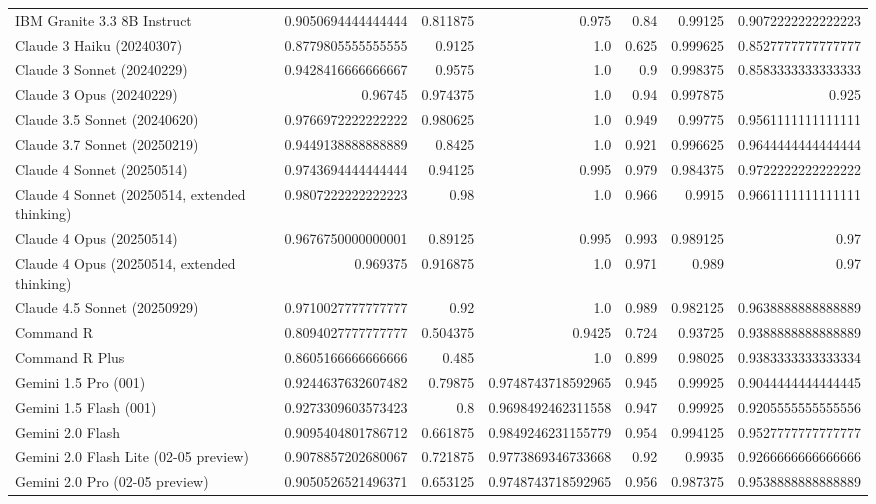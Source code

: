 \begin{table}[htp]
{\begin{tabular}{lrrrrrr}
IBM Granite 3.3 8B Instruct & 0.9050694444444444 & 0.811875 & 0.975 & 0.84 & 0.99125 & 0.9072222222222223 \\
Claude 3 Haiku (20240307) & 0.8779805555555555 & 0.9125 & 1.0 & 0.625 & 0.999625 & 0.8527777777777777 \\
Claude 3 Sonnet (20240229) & 0.9428416666666667 & 0.9575 & 1.0 & 0.9 & 0.998375 & 0.8583333333333333 \\
Claude 3 Opus (20240229) & 0.96745 & 0.974375 & 1.0 & 0.94 & 0.997875 & 0.925 \\
Claude 3.5 Sonnet (20240620) & 0.9766972222222222 & 0.980625 & 1.0 & 0.949 & 0.99775 & 0.9561111111111111 \\
Claude 3.7 Sonnet (20250219) & 0.9449138888888889 & 0.8425 & 1.0 & 0.921 & 0.996625 & 0.9644444444444444 \\
Claude 4 Sonnet (20250514) & 0.9743694444444444 & 0.94125 & 0.995 & 0.979 & 0.984375 & 0.9722222222222222 \\
Claude 4 Sonnet (20250514, extended thinking) & 0.9807222222222223 & 0.98 & 1.0 & 0.966 & 0.9915 & 0.9661111111111111 \\
Claude 4 Opus (20250514) & 0.9676750000000001 & 0.89125 & 0.995 & 0.993 & 0.989125 & 0.97 \\
Claude 4 Opus (20250514, extended thinking) & 0.969375 & 0.916875 & 1.0 & 0.971 & 0.989 & 0.97 \\
Claude 4.5 Sonnet (20250929) & 0.9710027777777777 & 0.92 & 1.0 & 0.989 & 0.982125 & 0.9638888888888889 \\
Command R & 0.8094027777777777 & 0.504375 & 0.9425 & 0.724 & 0.93725 & 0.9388888888888889 \\
Command R Plus & 0.8605166666666666 & 0.485 & 1.0 & 0.899 & 0.98025 & 0.9383333333333334 \\
Gemini 1.5 Pro (001) & 0.9244637632607482 & 0.79875 & 0.9748743718592965 & 0.945 & 0.99925 & 0.9044444444444445 \\
Gemini 1.5 Flash (001) & 0.9273309603573423 & 0.8 & 0.9698492462311558 & 0.947 & 0.99925 & 0.9205555555555556 \\
Gemini 2.0 Flash & 0.9095404801786712 & 0.661875 & 0.9849246231155779 & 0.954 & 0.994125 & 0.9527777777777777 \\
Gemini 2.0 Flash Lite (02-05 preview) & 0.9078857202680067 & 0.721875 & 0.9773869346733668 & 0.92 & 0.9935 & 0.9266666666666666 \\
Gemini 2.0 Pro (02-05 preview) & 0.9050526521496371 & 0.653125 & 0.9748743718592965 & 0.956 & 0.987375 & 0.9538888888888889 \\

\end{tabular}}
\end{table}
